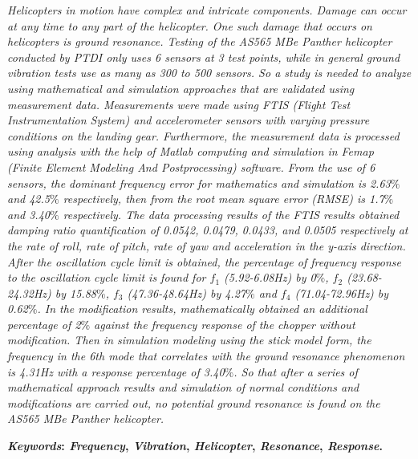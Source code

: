 \emph{Helicopters in motion have complex and intricate components. Damage can occur at any time to any part of the helicopter. One such damage that occurs on helicopters is ground resonance. Testing of the AS565 MBe Panther helicopter conducted by PTDI only uses 6 sensors at 3 test points, while in general ground vibration tests use as many as 300 to 500 sensors. So a study is needed to analyze using mathematical and simulation approaches that are validated using measurement data. Measurements were made using FTIS (Flight Test Instrumentation System) and accelerometer sensors with varying pressure conditions on the landing gear. Furthermore, the measurement data is processed using analysis with the help of Matlab computing and simulation in Femap (Finite Element Modeling And Postprocessing) software. From the use of 6 sensors, the dominant frequency error for mathematics and simulation is 2.63$\%$ and 42.5$\%$ respectively, then from the root mean square error (RMSE) is 1.7$\%$ and 3.40$\%$ respectively. The data processing results of the FTIS results obtained damping ratio quantification of 0.0542, 0.0479, 0.0433, and 0.0505 respectively at the rate of roll, rate of pitch, rate of yaw and acceleration in the y-axis direction. After the oscillation cycle limit is obtained, the percentage of frequency response to the oscillation cycle limit is found for $f_1$ (5.92-6.08Hz) by 0$\%$, $f_2$ (23.68-24.32Hz) by 15.88$\%$, $f_3$ (47.36-48.64Hz) by 4.27$\%$ and $f_4$ (71.04-72.96Hz) by 0.62$\%$. In the modification results, mathematically obtained an additional percentage of 2$\%$ against the frequency response of the chopper without modification. Then in simulation modeling using the stick model form, the frequency in the 6th mode that correlates with the ground resonance phenomenon is 4.31Hz with a response percentage of 3.40$\%$. So that after a series of mathematical approach results and simulation of normal conditions and modifications are carried out, no potential ground resonance is found on the AS565 MBe Panther helicopter.}

\vspace{2ex}

\begingroup
\noindent
\begin{normalsize}
\textbf{\emph{Keywords}: \emph{Frequency}, \emph{Vibration}, \emph{Helicopter}, \emph{Resonance}, \emph{Response}.}
\end{normalsize}
\endgroup


